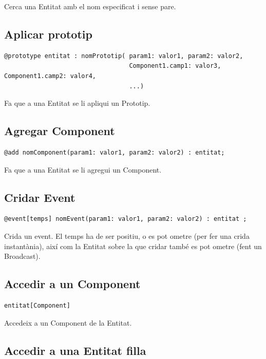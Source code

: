 Cerca una Entitat amb el nom especificat i sense pare.

\subsection{Aplicar prototip}

\begin{verbatim}
@prototype entitat : nomPrototip( param1: valor1, param2: valor2, 
                                  Component1.camp1: valor3, Component1.camp2: valor4,
                                  ...)
\end{verbatim}

Fa que a una Entitat se li apliqui un Prototip.

\subsection{Agregar Component}

\begin{verbatim}
@add nomComponent(param1: valor1, param2: valor2) : entitat;
\end{verbatim}

Fa que a una Entitat se li agregui un Component.

\subsection{Cridar Event}

\begin{verbatim}
@event[temps] nomEvent(param1: valor1, param2: valor2) : entitat ;
\end{verbatim}

Crida un event. El temps ha de ser positiu, o es pot ometre (per fer una crida instantània), així com la Entitat sobre la que cridar també es pot ometre (fent un Broadcast).

\subsection{Accedir a un Component}

\begin{verbatim}
entitat[Component]
\end{verbatim}

Accedeix a un Component de la Entitat.

\subsection{Accedir a una Entitat filla}

